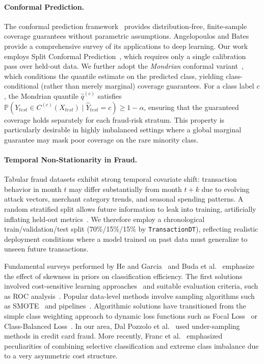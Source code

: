 \documentclass[12pt,a4paper]{article}
\begin{document}
\paragraph{Conformal Prediction.}
The conformal prediction framework~\cite{b31} provides distribution-free,
finite-sample coverage guarantees without parametric assumptions. Angelopoulos
and Bates~\cite{b32} provide a comprehensive survey of its applications to
deep learning. Our work employs Split Conformal Prediction~\cite{b33}, which
requires only a single calibration pass over held-out data. We further adopt the
\textit{Mondrian} conformal variant~\cite{b34}, which conditions the quantile
estimate on the predicted class, yielding class-conditional (rather than merely
marginal) coverage guarantees. For a class label $c$, the Mondrian quantile
$\hat{q}^{(c)}$ satisfies $\mathbb{P}(Y_{test}\in C^{(c)}(X_{test})\mid
\hat{Y}_{test}=c)\geq 1-\alpha$, ensuring that the guaranteed coverage holds
separately for each fraud-risk stratum. This property is particularly desirable
in highly imbalanced settings where a global marginal guarantee may mask poor
coverage on the rare minority class.

\paragraph{Temporal Non-Stationarity in Fraud.}
Tabular fraud datasets exhibit strong temporal covariate shift: transaction
behavior in month $t$ may differ substantially from month $t+k$ due to evolving
attack vectors, merchant category trends, and seasonal spending patterns. A
random stratified split allows future information to leak into training,
artificially inflating held-out metrics~\cite{b35}. We therefore employ a
chronological train/validation/test split (70\%/15\%/15\% by
\texttt{TransactionDT}), reflecting realistic deployment conditions where a
model trained on past data must generalize to unseen future transactions.

Fundamental surveys performed by He and Garcia~\cite{b13} and Buda et
al.~\cite{b14} emphasize the effect of skewness in priors on classification
efficiency. The first solutions involved cost-sensitive learning
approaches~\cite{b15} and suitable evaluation criteria, such as ROC
analysis~\cite{b16}. Popular data-level methods involve sampling algorithms such
as SMOTE~\cite{b17} and pipelines~\cite{b18}. Algorithmic solutions have
transitioned from the simple class weighting approach to dynamic loss functions
such as Focal Loss~\cite{b19} or Class-Balanced Loss~\cite{b20}. In our area,
Dal Pozzolo et al.~\cite{b21} used under-sampling methods in credit card fraud.
More recently, Franc et al.~\cite{b22} emphasized peculiarities of combining
selective classification and extreme class imbalance due to a very asymmetric
cost structure.
\end{document}

